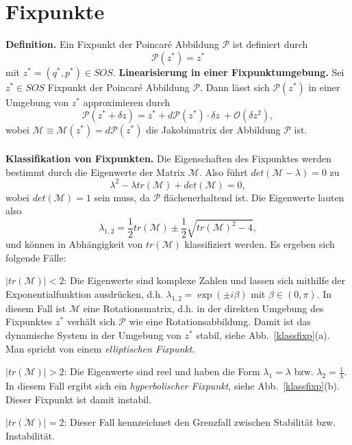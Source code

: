 \documentclass[11pt,a4paper]{article}
\begin{document}
\section{Fixpunkte}
\textbf{Definition.} Ein Fixpunkt der Poincar\'{e} Abbildung $ \mathcal{P} $ ist definiert durch \[\mathcal{P}(z^*)=z^*\] mit $ z^*=(q^*,p^*) \in SOS $.
\newline
\newline
\textbf{Linearisierung in einer Fixpunktumgebung.} Sei $ z^* \in SOS $ Fixpunkt der Poincar\'{e} Abbildung $ \mathcal{P} $. Dann lässt sich $ \mathcal{P}(z^*) $ in einer Umgebung von $ z^* $ approximieren durch \[ \mathcal{P}(z^* + \delta z) = z^* + d\mathcal{P}(z^*)\cdot \delta z\ + \mathcal{O}(\delta z^2),\] wobei $ \mathcal{M} \equiv \mathcal{M}(z^*) = d\mathcal{P}(z^*) $ die Jakobimatrix der Abbildung $ \mathcal{P} $ ist.
\\
\\
\textbf{Klassifikation von Fixpunkten.} Die Eigenschaften des Fixpunktes werden bestimmt durch die Eigenwerte der Matrix $ \mathcal{M} $. Also führt $ det( \mathcal{M} - \lambda) = 0 $ zu\[ \lambda^2 - \lambda tr( \mathcal{M}) + det( \mathcal{M}) = 0, \] wobei $ det( \mathcal{M}) = 1$ sein muss, da $ \mathcal{P} $ flächenerhaltend ist. Die Eigenwerte lauten also \[ \lambda_{1,2} = \frac{1}{2}tr( \mathcal{M}) \pm \frac{1}{2}\sqrt{tr( \mathcal{M})^2 -4 }, \] und können in Abhängigkeit von $ tr( \mathcal{M}) $ klassifiziert werden. Es ergeben sich folgende Fälle:
\begin{compactenum}[(i)]
\item $ \vert tr( \mathcal{M})\vert < 2  $: Die Eigenwerte sind komplexe Zahlen und lassen sich mithilfe der Exponentialfunktion ausdrücken, d.h. $ \lambda_{1,2} = \exp(\pm i \beta) $ mit $ \beta \in (0,\pi) $.
In diesem Fall ist $ \mathcal{M} $ eine Rotationsmatrix, d.h. in der direkten Umgebung des Fixpunktes $ z^* $ verhält sich $ \mathcal{P} $ wie eine Rotationsabbildung. Damit ist das dynamische System in der Umgebung von  $ z^* $ stabil, siehe Abb.~\ref{klassfixp}(a). Man spricht von einem \textit{elliptischen Fixpunkt}.
\item $ \vert tr( \mathcal{M}) \vert > 2 $: Die Eigenwerte sind reel und haben die Form $ \lambda_1 = \lambda $ bzw. $ \lambda_2 = \frac{1}{\lambda} $. In diesem Fall ergibt sich ein \textit{hyperbolischer Fixpunkt}, siehe Abb.~\ref{klassfixp}(b). Dieser Fixpunkt ist damit instabil.
\item $ \vert tr( \mathcal{M}) \vert = 2 $: Dieser Fall kennzeichnet den Grenzfall zwischen Stabilität bzw. Instabilität.
\end{compactenum}
\end{document}
